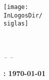 \pagestyle{empty}

\begin{center}
\texttt{[image: \\InLogosDir/\\siglas]}\\
\end{center}
\vspace{1cm}
\begin{center}
\begin{huge}
\BookTitle\\
\vspace{1cm}
\SchoolName
\end{huge}
\end{center}

\vspace{2cm}

\begin{center}
\begin{Large}\textit{-- \Semester --}\end{Large}
\end{center}
\vspace{2cm}

\begin{center}
\begin{Large}\textbf{\city: \today}\end{Large}
\end{center}

